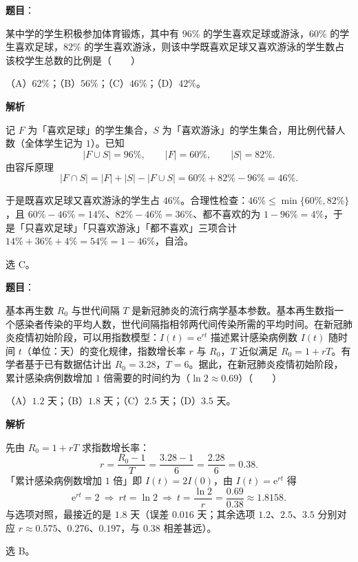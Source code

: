 \begin{answer}

\textbf{题目}：

某中学的学生积极参加体育锻炼，其中有 $96\%$ 的学生喜欢足球或游泳，$60\%$ 的学生喜欢足球，$82\%$ 的学生喜欢游泳，则该中学既喜欢足球又喜欢游泳的学生数占该校学生总数的比例是\mbox{（　　）}

（A）$62\%$；（B）$56\%$；（C）$46\%$；（D）$42\%$。

\textbf{解析}

记 $F$ 为「喜欢足球」的学生集合，$S$ 为「喜欢游泳」的学生集合，用比例代替人数（全体学生记为 $1$）。已知
\nopagebreak[4]
\[|F\cup S|=96\%,\qquad |F|=60\%,\qquad |S|=82\% .\]
由容斥原理
\nopagebreak[4]
\[|F\cap S|=|F|+|S|-|F\cup S|=60\%+82\%-96\%=46\% .\]

于是既喜欢足球又喜欢游泳的学生占 $46\%$。合理性检查：$46\%\leqslant\min\{60\%,82\%\}$，且 $60\%-46\%=14\%$、$82\%-46\%=36\%$、都不喜欢的为 $1-96\%=4\%$，于是「只喜欢足球」「只喜欢游泳」「都不喜欢」三项合计 $14\%+36\%+4\%=54\%=1-46\%$，自洽。

选 C。


\end{answer}
\begin{answer}

\textbf{题目}：

基本再生数 $R_0$ 与世代间隔 $T$ 是新冠肺炎的流行病学基本参数。基本再生数指一个感染者传染的平均人数，世代间隔指相邻两代间传染所需的平均时间。在新冠肺炎疫情初始阶段，可以用指数模型：$I(t)=\mathrm e^{rt}$ 描述累计感染病例数 $I(t)$ 随时间 $t$（单位：天）的变化规律，指数增长率 $r$ 与 $R_0$，$T$ 近似满足 $R_0=1+rT$。有学者基于已有数据估计出 $R_0=3.28$，$T=6$。据此，在新冠肺炎疫情初始阶段，累计感染病例数增加 $1$ 倍需要的时间约为（$\ln2\approx0.69$）\mbox{（　　）}

（A）$1.2$ 天；（B）$1.8$ 天；（C）$2.5$ 天；（D）$3.5$ 天。

\textbf{解析}

先由 $R_0=1+rT$ 求指数增长率：
\nopagebreak[4]
\[r=\frac{R_0-1}{T}=\frac{3.28-1}{6}=\frac{2.28}6=0.38 .\]
「累计感染病例数增加 $1$ 倍」即 $I(t)=2I(0)$，由 $I(t)=\mathrm e^{rt}$ 得
\nopagebreak[4]
\[\mathrm e^{rt}=2\ \Longrightarrow\ rt=\ln2\ \Longrightarrow\ t=\frac{\ln2}{r}=\frac{0.69}{0.38}\approx1.8158 .\]
与选项对照，最接近的是 $1.8$ 天（误差 $0.016$ 天；其余选项 $1.2$、$2.5$、$3.5$ 分别对应 $r\approx0.575$、$0.276$、$0.197$，与 $0.38$ 相差甚远）。

选 B。


\end{answer}
